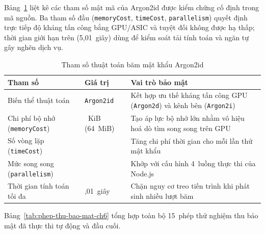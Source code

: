 Bảng~\ref{tab:tham-so-argon2id-ch6} liệt kê các tham số mật mã của Argon2id được kiểm chứng cố định trong mã nguồn. Ba tham số đầu (\texttt{memoryCost}, \texttt{timeCost}, \texttt{parallelism}) quyết định trực tiếp độ kháng tấn công bằng GPU/ASIC và tuyệt đối không được hạ thấp; thời gian giới hạn trên (5,01~giây) dùng để kiểm soát tải tính toán và ngăn tự gây nghẽn dịch vụ.

\begin{table}[htbp]
\centering
\caption{Tham số thuật toán băm mật khẩu Argon2id}
\label{tab:tham-so-argon2id-ch6}
\small
\begin{tabularx}{\textwidth}{
  >{\raggedright\arraybackslash}p{4.6cm}
  >{\raggedright\arraybackslash}p{3.4cm}
  >{\raggedright\arraybackslash}X
}
\toprule
\textbf{Tham số} & \textbf{Giá trị} & \textbf{Vai trò bảo mật} \\
\midrule
Biến thể thuật toán & \texttt{Argon2id} & Kết hợp ưu thế kháng tấn công GPU (\texttt{Argon2d}) và kênh bên (\texttt{Argon2i}) \\
\midrule
Chi phí bộ nhớ (\texttt{memoryCost}) & 65.536~KiB (64~MiB) & Tạo áp lực bộ nhớ lớn nhằm vô hiệu hoá dò tìm song song trên GPU \\
\midrule
Số vòng lặp (\texttt{timeCost}) & 3 & Tăng chi phí thời gian cho mỗi lần thử mật khẩu \\
\midrule
Mức song song (\texttt{parallelism}) & 4 & Khớp với cấu hình 4~luồng thực thi của Node.js \\
\midrule
Thời gian tính toán tối đa & 5,01~giây & Chặn nguy cơ treo tiến trình khi phát sinh nhiều lượt băm \\
\bottomrule
\end{tabularx}
\end{table}

Bảng~\ref{tab:phep-thu-bao-mat-ch6} tổng hợp toàn bộ 15~phép thử nghiệm thu bảo mật đã thực thi tự động và đầu cuối.

